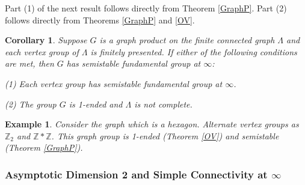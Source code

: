 \documentclass[12pt]{article}
\newtheorem{corollary}[theorem]{Corollary}
\newtheorem{example}[theorem]{Example}
\begin{document}
Part (1) of the next result follows directly from Theorem \ref{GraphP}. Part (2) follows directly from Theorems \ref{GraphP} and \ref{OV}.
 
\begin{corollary} \label{C11}
 Suppose $G$ is a graph product on the finite connected graph $\Lambda$ and each vertex group of $\Lambda$ is finitely presented. If either of the following conditions are met, then $G$ has semistable fundamental group at $\infty$:

 (1) Each vertex group has semistable fundamental group at $\infty$.
 
  (2) The group $G$ is 1-ended and $\Lambda$ is not complete. 
\end{corollary}

\begin{example}
Consider the graph which is a hexagon. Alternate vertex groups as $\mathbb Z_2$ and $\mathbb Z\ast \mathbb Z$. This graph group is 1-ended (Theorem \ref{OV})  and semistable (Theorem \ref{GraphP}).

\end{example}




\subsubsection{Asymptotic Dimension 2 and Simple Connectivity at $\infty$}  \label{AD2}
\end{document}
